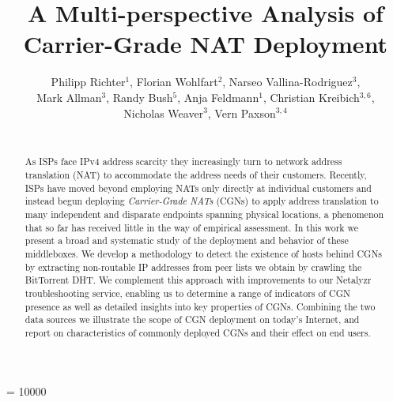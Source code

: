 \documentclass[10pt]{sig-alternate-05-2015}
\begin{document}

\widowpenalty = 10000


\title{A Multi-perspective Analysis of\\ Carrier-Grade NAT Deployment}



\author{
\alignauthor
  Philipp Richter$^1$, Florian Wohlfart$^2$, Narseo Vallina-Rodriguez$^3$,\\ 
  \vspace{1mm}
  Mark Allman$^3$, Randy Bush$^5$, Anja Feldmann$^1$, Christian 
  Kreibich$^{3,6}$,\\ \vspace{1mm} 
  Nicholas Weaver$^{3}$, Vern Paxson$^{3,4}$ \\ \vspace{2mm}
  \\
}

\maketitle

\begin{abstract}

As ISPs face IPv4 address scarcity they increasingly turn to network
address translation (NAT) to accommodate the address needs of their
customers.  Recently, ISPs have moved beyond employing NATs only
directly at individual customers and instead begun deploying
\textit{Carrier-Grade NATs} (CGNs) to apply address translation to
many independent and disparate endpoints spanning physical locations,
a phenomenon that so far has received little in the way of empirical
assessment.
In this work we present a broad and systematic study of the
deployment and behavior of these middleboxes.
We develop a methodology to detect the existence of hosts behind CGNs
by extracting non-routable IP addresses from peer lists we obtain by
crawling the BitTorrent DHT. We complement this approach with
improvements to our Netalyzr troubleshooting service, enabling us to
determine a range of indicators of CGN presence as well as detailed insights 
into key properties of CGNs.
Combining the two data sources we illustrate the scope of CGN
deployment on today's Internet, and report on characteristics of commonly
deployed CGNs and their effect on end users.

\end{abstract}
\end{document}
